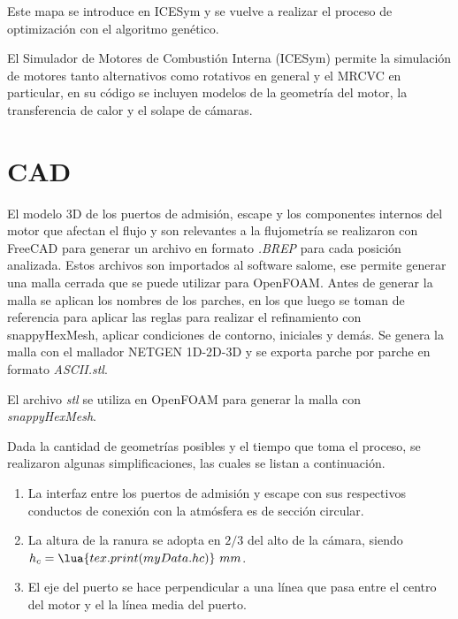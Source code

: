 Este mapa se introduce en ICESym y se vuelve a realizar el proceso de
optimización con el algoritmo genético.

El Simulador de Motores de Combustión Interna (ICESym) permite la simulación de
motores tanto alternativos como rotativos en general y el MRCVC en particular,
en su código se incluyen modelos de la geometría del motor, la transferencia de
calor y el solape de cámaras.




\section{CAD}
%
El modelo 3D de los puertos de admisión, escape y los componentes internos del
motor que afectan el flujo y son relevantes a la flujometría se realizaron con
FreeCAD\parencite{freecad} para generar un archivo en formato \emph{.BREP} para cada
posición analizada.
%
Estos archivos son importados al software salome\parencite{salome}, ese permite
generar una malla cerrada que se puede utilizar para OpenFOAM.\@
%
Antes de generar la malla se aplican los nombres de los parches, en los que
luego se toman de referencia para aplicar las reglas para realizar el
refinamiento con snappyHexMesh, aplicar condiciones de contorno, iniciales y
demás.
%
Se genera la malla con el mallador NETGEN 1D-2D-3D y se exporta parche por
parche en formato \emph{ASCII.stl}.

%
El archivo \emph{stl} se utiliza en OpenFOAM para generar la malla con
\emph{snappyHexMesh}.

Dada la cantidad de geometrías posibles y el tiempo que toma el proceso, se
realizaron algunas simplificaciones, las cuales se listan a continuación.


%
\begin{enumerate}

    \item La interfaz entre los puertos de admisión y escape con sus respectivos
        conductos de conexión con la atmósfera es de sección circular.
    \item La altura de la ranura se adopta en $2/3$ del alto de la cámara,
        siendo $h_c=\lua{tex.print(myData.hc)}\ mm$.
    \item El eje del puerto se hace perpendicular a una línea que pasa entre el
        centro del motor y el la línea media del puerto.
\end{enumerate}


